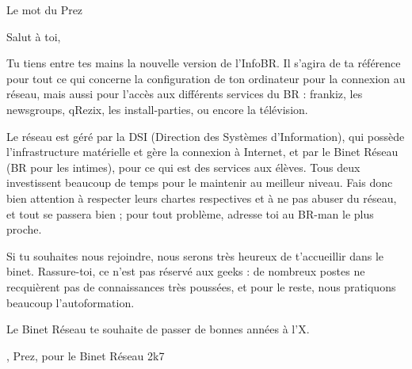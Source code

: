 

\begin{center}
    { \Huge Le mot du Prez }
\end{center}

\indent \indent Salut \`a toi,

Tu tiens entre tes mains la nouvelle version de l'InfoBR. Il s'agira de ta r\'ef\'erence pour tout ce qui concerne la configuration de ton ordinateur pour la connexion au r\'eseau, mais aussi pour l'acc\`es aux diff\'erents services du BR :
frankiz, les newsgroups, qRezix, les install-parties, ou encore la t\'el\'evision.

Le r\'eseau est g\'er\'e par la DSI (Direction des Syst\`emes d'Information), qui poss\`ede l'infrastructure mat\'erielle et g\`ere la connexion \`a Internet,
et par le Binet R\'eseau (BR pour les intimes), pour ce qui est des services aux \'el\`eves. Tous deux investissent beaucoup de temps pour le maintenir au meilleur niveau.
Fais donc bien attention \`a respecter leurs chartes respectives et \`a ne pas abuser du r\'eseau, et tout se passera bien ; pour tout probl\`eme, adresse toi au
BR-man le plus proche.

Si tu souhaites nous rejoindre, nous serons tr\`es heureux de t'accueillir dans le binet. Rassure-toi, ce n'est pas r\'eserv\'e aux geeks : de nombreux postes ne recqui\`erent pas de connaissances tr\`es pouss\'ees, et pour le reste, nous pratiquons beaucoup l'autoformation.

Le Binet R\'eseau te souhaite de passer de bonnes ann\'ees \`a l'X.

\begin{flushright}
    , Prez, pour le Binet R\'eseau 2k7
\end{flushright}
